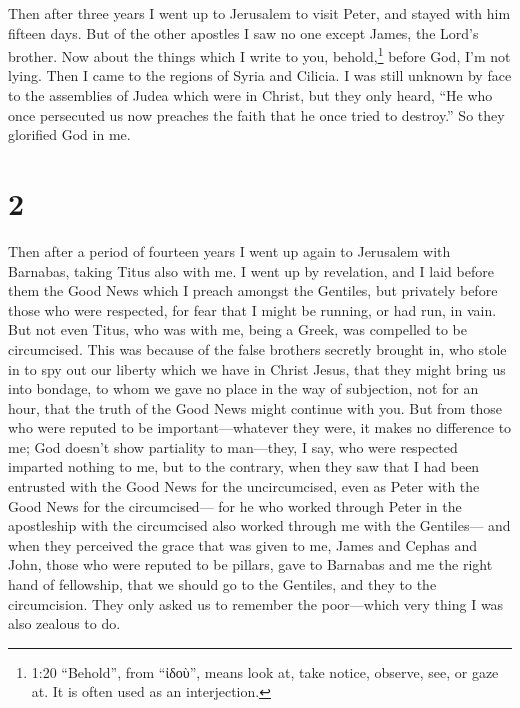  Then after three years I went up to Jerusalem to visit
Peter, and stayed with him fifteen days.  But of the other
apostles I saw no one except James, the Lord's brother. 
Now about the things which I write to you, behold,\footnote{1:20
  ``Behold'', from ``ἰδοὺ'', means look at, take notice, observe, see,
  or gaze at. It is often used as an interjection.} before God, I'm not
lying.  Then I came to the regions of Syria and Cilicia.
 I was still unknown by face to the assemblies of Judea
which were in Christ,  but they only heard, ``He who once
persecuted us now preaches the faith that he once tried to destroy.''
 So they glorified God in me.

\hypertarget{section-1}{%
\section{2}\label{section-1}}

 Then after a period of fourteen years I went up again to
Jerusalem with Barnabas, taking Titus also with me.  I went
up by revelation, and I laid before them the Good News which I preach
amongst the Gentiles, but privately before those who were respected, for
fear that I might be running, or had run, in vain.  But not
even Titus, who was with me, being a Greek, was compelled to be
circumcised.  This was because of the false brothers
secretly brought in, who stole in to spy out our liberty which we have
in Christ Jesus, that they might bring us into bondage,  to
whom we gave no place in the way of subjection, not for an hour, that
the truth of the Good News might continue with you.  But
from those who were reputed to be important---whatever they were, it
makes no difference to me; God doesn't show partiality to man---they, I
say, who were respected imparted nothing to me,  but to the
contrary, when they saw that I had been entrusted with the Good News for
the uncircumcised, even as Peter with the Good News for the
circumcised---  for he who worked through Peter in the
apostleship with the circumcised also worked through me with the
Gentiles---  and when they perceived the grace that was
given to me, James and Cephas and John, those who were reputed to be
pillars, gave to Barnabas and me the right hand of fellowship, that we
should go to the Gentiles, and they to the circumcision. 
They only asked us to remember the poor---which very thing I was also
zealous to do.

